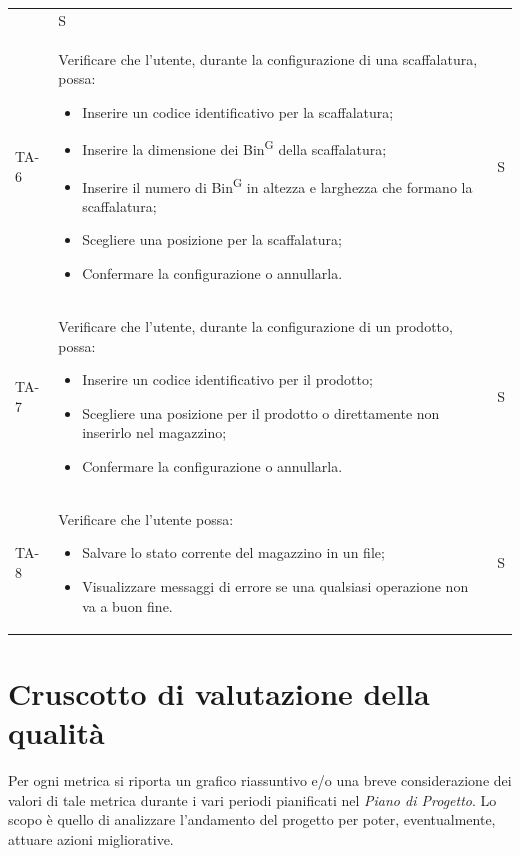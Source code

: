 \begin{xltabular}{0.9\textwidth}{X | p{0.7\textwidth} | X}
\begin{itemize}
    \end{itemize} 
    & S \\
    TA-6 & Verificare che l'utente, durante la configurazione di una scaffalatura, possa:
    \begin{itemize}
        \item Inserire un codice identificativo per la scaffalatura;
        \item Inserire la dimensione dei Bin\textsuperscript{G} della scaffalatura;
        \item Inserire il numero di Bin\textsuperscript{G} in altezza e larghezza che formano la scaffalatura;
        \item Scegliere una posizione per la scaffalatura;
        \item Confermare la configurazione o annullarla.
    \end{itemize} 
    & S \\
    TA-7 & Verificare che l'utente, durante la configurazione di un prodotto, possa:
    \begin{itemize}
        \item Inserire un codice identificativo per il prodotto;
        \item Scegliere una posizione per il prodotto o direttamente non inserirlo nel magazzino;
        \item Confermare la configurazione o annullarla.
    \end{itemize} 
    & S \\
    TA-8 & Verificare che l'utente possa:
    \begin{itemize}
        \item Salvare lo stato corrente del magazzino in un file;
        \item Visualizzare messaggi di errore se una qualsiasi operazione non va a buon fine.
    \end{itemize} 
    & S \\
    \hline
\end{xltabular}


\newpage
\section{Cruscotto di valutazione della qualità}\label{resoconto}
Per ogni metrica si riporta un grafico riassuntivo e/o una breve considerazione dei valori di tale metrica durante i vari periodi pianificati nel \textit{Piano di Progetto}. Lo scopo è quello di analizzare l'andamento del progetto per poter, eventualmente, attuare azioni migliorative.

